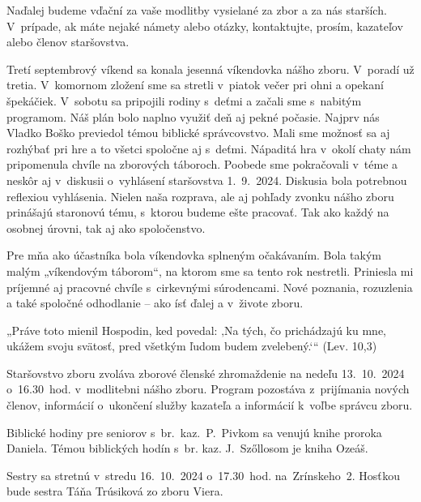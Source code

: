 Naďalej budeme vďační za vaše modlitby vysielané za zbor a za nás starších. V~prípade, ak máte nejaké námety alebo otázky, kontaktujte, prosím, kazateľov alebo členov staršovstva.




Tretí septembrový víkend sa konala jesenná víkendovka nášho zboru. V~poradí už tretia. V~komornom zložení sme sa stretli v~piatok večer pri ohni a opekaní špekáčiek. V~sobotu sa pripojili rodiny s~deťmi a začali sme s~nabitým programom. Náš plán bolo naplno využiť deň aj pekné počasie. Najprv nás Vladko Boško previedol témou biblické správcovstvo. Mali sme možnosť sa aj rozhýbať pri hre a to všetci spoločne aj s~deťmi. Nápaditá hra v~okolí chaty nám pripomenula chvíle na zborových táboroch. Poobede sme pokračovali v~téme a neskôr aj v~diskusii o~vyhlásení staršovstva 1.~9.~2024. Diskusia bola potrebnou reflexiou vyhlásenia. Nielen naša rozprava, ale aj pohľady zvonku nášho zboru prinášajú staronovú tému, s~ktorou budeme ešte pracovať. Tak ako každý na osobnej úrovni, tak aj ako spoločenstvo.

Pre mňa ako účastníka bola víkendovka splneným očakávaním. Bola takým malým „víkendovým táborom“, na ktorom sme sa tento rok nestretli. Priniesla mi príjemné aj pracovné chvíle s~cirkevnými súrodencami. Nové poznania, rozuzlenia a také spoločné odhodlanie -- ako ísť ďalej a v~živote zboru.




„Práve toto mienil Hospodin, ked povedal: ‚Na tých, čo prichádzajú ku mne, ukážem svoju svätosť, pred všetkým ľudom budem zvelebený.‘“ (Lev. 10,3)



Staršovstvo zboru zvoláva zborové členské zhromaždenie na nedeľu 13.~10.~2024 o~16.30~hod. v~modlitebni nášho zboru. Program pozostáva z~prijímania nových členov, informácií o~ukončení služby kazateľa a informácií k~voľbe správcu zboru.



Biblické hodiny pre seniorov s~br.~kaz.~P.~Pivkom sa venujú knihe proroka Daniela. Témou biblických hodín s~br. kaz. J.~Szőllosom je kniha Ozeáš.



Sestry sa stretnú v~stredu 16.~10.~2024 o~17.30~hod. na~Zrínskeho~2. Hosťkou bude sestra Táňa Trúsiková zo zboru Viera.


